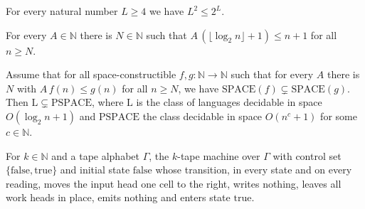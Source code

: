 \begin{lemma}
\label{Complexity.sph_sq_le_two_pow}
\leanok
{}
For every natural number $L\ge 4$ we have $L^2\le 2^L$.
\end{lemma}

\begin{lemma}
\label{Complexity.sph_logSpace_dom}
\leanok
{}
For every $A\in\mathbb{N}$ there is $N\in\mathbb{N}$ such that
$A\,(\lfloor\log_2 n\rfloor+1)\le n+1$ for all $n\ge N$.
\end{lemma}

\begin{lemma}
\label{Complexity.sph_logspace_ssubset}
\leanok
{}
Assume that for all space-constructible $f,g:\mathbb{N}\to\mathbb{N}$ such that for every $A$ there
is $N$ with $A\,f(n)\le g(n)$ for all $n\ge N$, we have $\mathrm{SPACE}(f)\subsetneq\mathrm{SPACE}(g)$.
Then $\mathrm{L}\subsetneq\mathrm{PSPACE}$, where $\mathrm{L}$ is the class of languages decidable in
space $O(\log_2 n+1)$ and $\mathrm{PSPACE}$ the class decidable in space $O(n^c+1)$ for some
$c\in\mathbb{N}$.
\end{lemma}

\begin{definition}
\label{Complexity.sphRightTM}
\leanok
{}
For $k\in\mathbb{N}$ and a tape alphabet $\Gamma$, the $k$-tape machine over $\Gamma$ with control
set $\{\mathrm{false},\mathrm{true}\}$ and initial state $\mathrm{false}$ whose transition, in every
state and on every reading, moves the input head one cell to the right, writes nothing, leaves all
work heads in place, emits nothing and enters state $\mathrm{true}$.
\end{definition}

